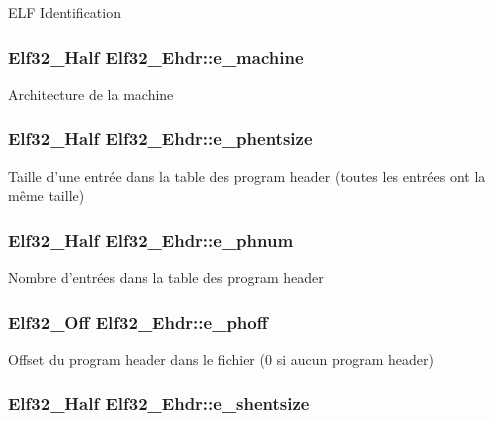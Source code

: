 E\+L\+F Identification \hypertarget{structElf32__Ehdr_a19bca7faba9e5573814643efc3574c7b}{
\subsubsection[{e\+\_\+machine}]{\setlength{\rightskip}{0pt plus 5cm}Elf32\+\_\+\+Half Elf32\+\_\+\+Ehdr\+::e\+\_\+machine}}\label{structElf32__Ehdr_a19bca7faba9e5573814643efc3574c7b}
Architecture de la machine \hypertarget{structElf32__Ehdr_afa2289f96d86fcc568a3b1f40cc8953e}{
\subsubsection[{e\+\_\+phentsize}]{\setlength{\rightskip}{0pt plus 5cm}Elf32\+\_\+\+Half Elf32\+\_\+\+Ehdr\+::e\+\_\+phentsize}}\label{structElf32__Ehdr_afa2289f96d86fcc568a3b1f40cc8953e}
Taille d'une entrée dans la table des program header (toutes les entrées ont la même taille) \hypertarget{structElf32__Ehdr_a360898812db1655f8cb8258780d9df5b}{
\subsubsection[{e\+\_\+phnum}]{\setlength{\rightskip}{0pt plus 5cm}Elf32\+\_\+\+Half Elf32\+\_\+\+Ehdr\+::e\+\_\+phnum}}\label{structElf32__Ehdr_a360898812db1655f8cb8258780d9df5b}
Nombre d'entrées dans la table des program header \hypertarget{structElf32__Ehdr_a25c36fc010284a928604aae005b67ad1}{
\subsubsection[{e\+\_\+phoff}]{\setlength{\rightskip}{0pt plus 5cm}Elf32\+\_\+\+Off Elf32\+\_\+\+Ehdr\+::e\+\_\+phoff}}\label{structElf32__Ehdr_a25c36fc010284a928604aae005b67ad1}
Offset du program header dans le fichier (0 si aucun program header) \hypertarget{structElf32__Ehdr_ab53c709a841960e499da68e2316ed428}{
\subsubsection[{e\+\_\+shentsize}]{\setlength{\rightskip}{0pt plus 5cm}Elf32\+\_\+\+Half Elf32\+\_\+\+Ehdr\+::e\+\_\+shentsize}}\label{structElf32__Ehdr_ab53c709a841960e499da68e2316ed428}
